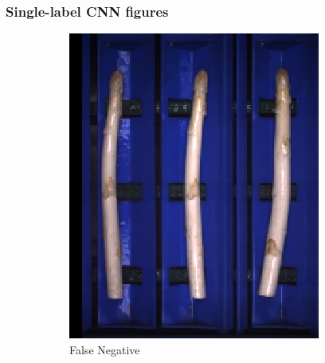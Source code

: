 \subsubsection{Single-label CNN figures}
\label{subsec:AdditionalSingleLabelCNN}

\begin{figure}[!htb]
	\centering
	\begin{subfigure}{0.3\textwidth}
		\includegraphics[width=0.9\linewidth]{Figures/appendix/violet_falsenegative_01.png}
		\vspace{-5pt}
		\caption{False Negative}
	\end{subfigure}
	\begin{subfigure}{0.3\textwidth}

\end{subfigure}
\end{figure}
